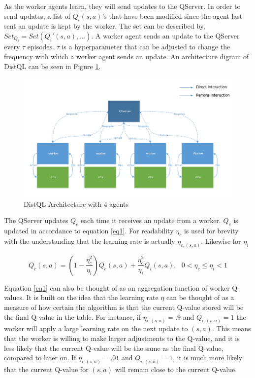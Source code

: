 \documentclass[jair,twoside,11pt,theapa]{article}
\begin{document}
As the worker agents learn, they will send updates to the QServer. In order to send updates, a list of $Q_i(s,a)$'s that have been modified since the agent last sent an update is kept by the worker. The set can be described by, $Set_{Q_i} = Set(Q_i'(s,a),...)$. A worker agent sends an update to the QServer every $\tau$ episodes. $\tau$ is a hyperparameter that can be adjusted to change the frequency with which a worker agent sends an update. An architecture digram of DistQL can be seen in Figure \ref{fig:DistQLArchitecture}. 

\begin{figure}[h]
\centering
\includegraphics[width=0.8\linewidth]{"DistQL Architecture-modified"}
\caption{DistQL Architecture with 4 agents}
\label{fig:DistQLArchitecture}
\end{figure}

The QServer updates $Q_c$ each time it receives an update from a worker. $Q_c$ is updated in accordance to equation \ref{eq1}. For readability $\eta_c$ is used for brevity with the understanding that the learning rate is actually $\eta_{c,(s,a)}$. Likewise for $\eta_i$

\begin{equation}
\label{eq1}
Q_c(s,a) = (1-\frac{\eta_{c}^{2}}{\eta_{i}})Q_c(s,a) + \frac{\eta_{c}^{2}}{\eta_{i}} Q_i(s,a), \text{  } 0 < \eta_{c} \leq \eta_{i} < 1
\end{equation}

Equation \ref{eq1} can also be thought of as an aggregation function of worker Q-values. It is built on the idea that the learning rate $\eta$ can be thought of as a measure of how certain the algorithm is that the current Q-value stored will be the final Q-value in the table. For instance, if $\eta_{i,(s,a)} = .9$ and $Q_{i,(s,a)} = 1$ the worker will apply a large learning rate on the next update to $(s,a)$. This means that the worker is willing to make larger adjustments to the Q-value, and it is less likely that the current Q-value will be the same as the final Q-value, compared to later on. If $\eta_{i,(s,a)} = .01$ and $Q_{i,(s,a)} = 1$, it is much more likely that the current Q-value for $(s,a)$ will remain close to the current Q-value. 
\end{document}
